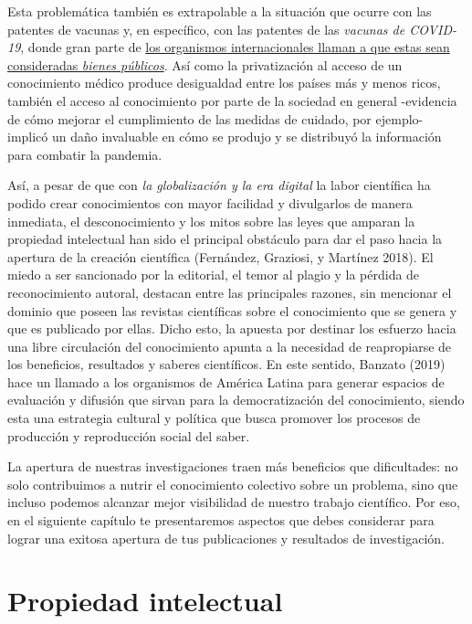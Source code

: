\documentclass[
  spanish,
  letterpaper,
  DIV=11,
  numbers=noendperiod]{scrreprt}
\begin{document}
Esta problemática también es extrapolable a la situación que ocurre con
las patentes de vacunas y, en específico, con las patentes de las
\emph{vacunas de COVID-19}, donde gran parte de
\href{https://en.unesco.org/news/unesco-calls-covid-19-vaccines-be-considered-global-public-good}{los
organismos internacionales llaman a que estas sean consideradas
\emph{bienes públicos}}. Así como la privatización al acceso de un
conocimiento médico produce desigualdad entre los países más y menos
ricos, también el acceso al conocimiento por parte de la sociedad en
general -evidencia de cómo mejorar el cumplimiento de las medidas de
cuidado, por ejemplo- implicó un daño invaluable en cómo se produjo y se
distribuyó la información para combatir la pandemia.

Así, a pesar de que con \emph{la globalización y la era digital} la
labor científica ha podido crear conocimientos con mayor facilidad y
divulgarlos de manera inmediata, el desconocimiento y los mitos sobre
las leyes que amparan la propiedad intelectual han sido el principal
obstáculo para dar el paso hacia la apertura de la creación científica
(Fernández, Graziosi, y Martínez 2018). El miedo a ser sancionado por la
editorial, el temor al plagio y la pérdida de reconocimiento autoral,
destacan entre las principales razones, sin mencionar el dominio que
poseen las revistas científicas sobre el conocimiento que se genera y
que es publicado por ellas. Dicho esto, la apuesta por destinar los
esfuerzo hacia una libre circulación del conocimiento apunta a la
necesidad de reapropiarse de los beneficios, resultados y saberes
científicos. En este sentido, Banzato (2019) hace un llamado a los
organismos de América Latina para generar espacios de evaluación y
difusión que sirvan para la democratización del conocimiento, siendo
esta una estrategia cultural y política que busca promover los procesos
de producción y reproducción social del saber.

La apertura de nuestras investigaciones traen más beneficios que
dificultades: no solo contribuimos a nutrir el conocimiento colectivo
sobre un problema, sino que incluso podemos alcanzar mejor visibilidad
de nuestro trabajo científico. Por eso, en el siguiente capítulo te
presentaremos aspectos que debes considerar para lograr una exitosa
apertura de tus publicaciones y resultados de investigación.

\section{Propiedad intelectual}\label{propiedad}
\end{document}
